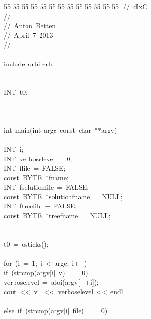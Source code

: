 %
%
\begin{tabbing}
55 \= 55 \= 55 \= 55 \= 55 \= 55 \= 55 \= 55 \= 55 \= 55 \= 55 \= 55 \= 55 \= \kill
//\ dlxC\\[0pt]
//\\[0pt]
//\ Anton\ Betten\\[0pt]
//\ April\ 7\ 2013\\[0pt]
//\\[0pt]
\\[0pt]
include\ orbiterh\\[0pt]
\\[0pt]
\\[0pt]
INT\ t0;\\[0pt]
\\[0pt]
\\[0pt]
\\[0pt]
int\ main(int\ argc\ const\ char\ **argv)\\[0pt]
\\[0pt]
\>INT\ i;\\[0pt]
\>INT\ verboselevel\ =\ 0;\\[0pt]
\>INT\ ffile\ =\ FALSE;\\[0pt]
\>const\ BYTE\ *fname;\\[0pt]
\>INT\ fsolutionfile\ =\ FALSE;\\[0pt]
\>const\ BYTE\ *solutionfname\ =\ NULL;\\[0pt]
\>INT\ ftreefile\ =\ FALSE;\\[0pt]
\>const\ BYTE\ *treefname\ =\ NULL;\\[0pt]
\\[0pt]
\\[0pt]
\>t0\ =\ osticks();\\[0pt]
\\[0pt]
\>for\ (i\ =\ 1;\ i\ <\ argc;\ i++)\ \\[0pt]
\>\>if\ (strcmp(argv[i]\ v)\ ==\ 0)\ \\[0pt]
\>\>\>verboselevel\ =\ atoi(argv[++i]);\\[0pt]
\>\>\>cout\ <<\ v\ \ <<\ verboselevel\ <<\ endl;\\[0pt]
\>\>\>\\[0pt]
\>\>else\ if\ (strcmp(argv[i]\ file)\ ==\ 0)\ \\[0pt]

\end{tabbing}
